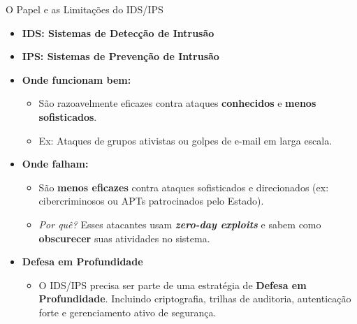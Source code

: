\begin{frame}{O Papel e as Limitações do IDS/IPS}
    \begin{itemize}

        \item \textbf{IDS: Sistemas de Detecção de Intrusão}
        \item \textbf{IPS: Sistemas de Prevenção de Intrusão}


        \item \textbf{Onde funcionam bem:}
              \begin{itemize}
                  \item São razoavelmente eficazes contra ataques \textbf{conhecidos} e \textbf{menos sofisticados}.
                  \item Ex: Ataques de grupos ativistas ou golpes de e-mail em larga escala.
              \end{itemize}

        \item \textbf{Onde falham:}
              \begin{itemize}
                  \item São \textbf{menos eficazes} contra ataques sofisticados e direcionados (ex: cibercriminosos ou APTs patrocinados pelo Estado).
                  \item \textit{Por quê?} Esses atacantes usam \textbf{\textit{zero-day exploits}} e sabem como \textbf{obscurecer} suas atividades no sistema.
              \end{itemize}

        \item \textbf{Defesa em Profundidade}
              \begin{itemize}
                  \item O IDS/IPS precisa ser parte de uma estratégia de \textbf{Defesa em Profundidade}. Incluindo criptografia, trilhas de auditoria, autenticação forte e gerenciamento ativo de segurança.
              \end{itemize}
    \end{itemize}
\end{frame}

